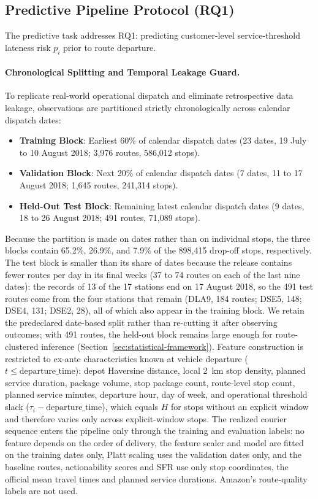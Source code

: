 \documentclass[11pt,a4paper]{article}
\begin{document}
\subsection{Predictive Pipeline Protocol (RQ1)}\label{sec:rq1-protocol}
The predictive task addresses RQ1: predicting customer-level service-threshold lateness risk $p_i$ prior to route departure.

\paragraph{Chronological Splitting and Temporal Leakage Guard.}
To replicate real-world operational dispatch and eliminate retrospective data leakage, observations are partitioned strictly chronologically across calendar dispatch dates:
\begin{itemize}
    \item \textbf{Training Block}: Earliest 60\% of calendar dispatch dates (23 dates, 19 July to 10 August 2018; 3,976 routes, 586,012 stops).
    \item \textbf{Validation Block}: Next 20\% of calendar dispatch dates (7 dates, 11 to 17 August 2018; 1,645 routes, 241,314 stops).
    \item \textbf{Held-Out Test Block}: Remaining latest calendar dispatch dates (9 dates, 18 to 26 August 2018; 491 routes, 71,089 stops).
\end{itemize}
Because the partition is made on dates rather than on individual stops, the three blocks contain 65.2\%, 26.9\%, and 7.9\% of the 898,415 drop-off stops, respectively. The test block is smaller than its share of dates because the release contains fewer routes per day in its final weeks (37 to 74 routes on each of the last nine dates): the records of 13 of the 17 stations end on 17 August 2018, so the 491 test routes come from the four stations that remain (DLA9, 184 routes; DSE5, 148; DSE4, 131; DSE2, 28), all of which also appear in the training block. We retain the predeclared date-based split rather than re-cutting it after observing outcomes; with 491 routes, the held-out block remains large enough for route-clustered inference (Section~\ref{sec:statistical-framework}).
Feature construction is restricted to ex-ante characteristics known at vehicle departure ($t \le \text{departure\_time}$): depot Haversine distance, local 2~km stop density, planned service duration, package volume, stop package count, route-level stop count, planned service minutes, departure hour, day of week, and operational threshold slack ($\tau_i - \text{departure\_time}$), which equals $H$ for stops without an explicit window and therefore varies only across explicit-window stops. The realized courier sequence enters the pipeline only through the training and evaluation labels: no feature depends on the order of delivery, the feature scaler and model are fitted on the training dates only, Platt scaling uses the validation dates only, and the baseline routes, actionability scores and SFR use only stop coordinates, the official mean travel times and planned service durations. Amazon's route-quality labels are not used.
\end{document}
